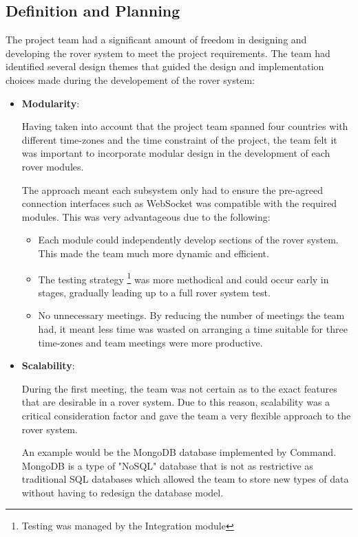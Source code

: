 \documentclass[11pt, a4paper]{article}
\begin{document}
\vfill

\pagebreak
\subsection{Definition and Planning}

The project team had a significant amount of freedom in designing and developing the rover system to meet the project requirements. The team had identified several design themes that guided the design and implementation choices made during the developement of the rover system:

\begin{itemize}    
    \item \textbf{Modularity}:
    
    Having taken into account that the project team spanned four countries with different time-zones and the time constraint of the project, the team felt it was important to incorporate modular design in the development of each rover modules. 
    
    The approach meant each subsystem only had to ensure the pre-agreed connection interfaces such as WebSocket was compatible with the required modules. This was very advantageous due to the following:
    \begin{itemize}
        \item Each module could independently develop sections of the rover system. This made the team much more dynamic and efficient.
        \item The testing strategy \footnote{Testing was managed by the Integration module} was more methodical and could occur early in stages, gradually leading up to a full rover system test.
        \item No unnecessary meetings. By reducing the number of meetings the team had, it meant less time was wasted on arranging a time suitable for three time-zones and team meetings were more productive.  
    \end{itemize}

    \item \textbf{Scalability}:
    
    During the first meeting, the team was not certain as to the exact features that are desirable in a rover system. Due to this reason, scalability was a critical consideration factor and gave the team a very flexible approach to the rover system. 
    
    An example would be the MongoDB database implemented by Command. MongoDB is a type of "NoSQL" database that is not as restrictive as traditional SQL databases which allowed the team to store new types of data without having to redesign the database model. 


\end{itemize}
\end{document}
